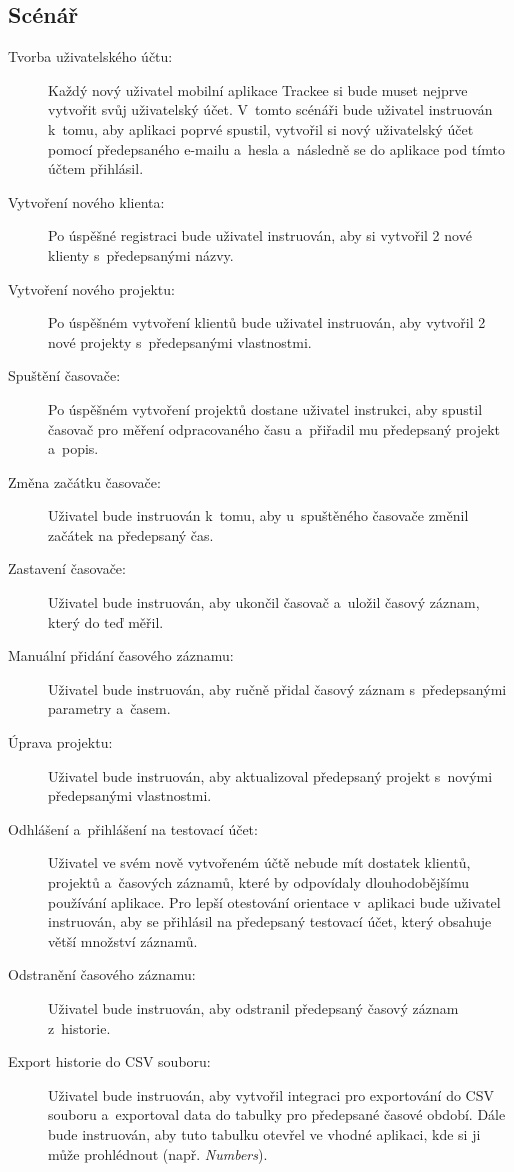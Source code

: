 \subsection{Scénář}

\begin{description}
\item[Tvorba uživatelského účtu:] Každý nový uživatel mobilní aplikace Trackee si bude muset nejprve vytvořit svůj uživatelský účet. V~tomto scénáři bude uživatel instruován k~tomu, aby aplikaci poprvé spustil, vytvořil si nový uživatelský účet pomocí předepsaného e-mailu a~hesla a~následně se do aplikace pod tímto účtem přihlásil. 
\item[Vytvoření nového klienta:] Po úspěšné registraci bude uživatel instruován, aby si vytvořil 2 nové klienty s~předepsanými názvy.
\item[Vytvoření nového projektu:] Po úspěšném vytvoření klientů bude uživatel instruován, aby vytvořil 2 nové projekty s~předepsanými vlastnostmi.
\item[Spuštění časovače:] Po úspěšném vytvoření projektů dostane uživatel instrukci, aby spustil časovač pro měření odpracovaného času a~přiřadil mu předepsaný projekt a~popis.
\item[Změna začátku časovače:] Uživatel bude instruován k~tomu, aby u~spuštěného časovače změnil začátek na předepsaný čas.
\item[Zastavení časovače:] Uživatel bude instruován, aby ukončil časovač a~uložil časový záznam, který do teď měřil.
\item[Manuální přidání časového záznamu:] Uživatel bude instruován, aby ručně přidal časový záznam s~předepsanými parametry a~časem.
\item[Úprava projektu:] Uživatel bude instruován, aby aktualizoval předepsaný projekt s~novými předepsanými vlastnostmi.
\item[Odhlášení a~přihlášení na testovací účet:] Uživatel ve svém nově vytvořeném účtě nebude mít dostatek klientů, projektů a~časových záznamů, které by odpovídaly dlouhodobějšímu používání aplikace. Pro lepší otestování orientace v~aplikaci bude uživatel instruován, aby se přihlásil na předepsaný testovací účet, který obsahuje větší množství záznamů.
\item[Odstranění časového záznamu:] Uživatel bude instruován, aby odstranil předepsaný časový záznam z~historie.
\item[Export historie do CSV souboru:] Uživatel bude instruován, aby vytvořil integraci pro exportování do CSV souboru a~exportoval data do tabulky pro předepsané časové období. Dále bude instruován, aby tuto tabulku otevřel ve vhodné aplikaci, kde si ji může prohlédnout (např. \emph{Numbers}).

\end{description}
